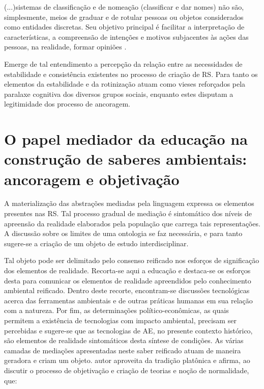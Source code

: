 \documentclass[
  12pt,       %
  openright,      %
  twoside,      %
  a4paper,      %
  english,      %
  french,       %
  spanish,      %
  brazil        %
  ]{abntex2}
\begin{document}
\begin{citacao}
(...)sistemas de classificação e de nomeação
(classificar e dar nomes) não são, simplesmente, meios de graduar
e de rotular pessoas ou objetos considerados como entidades 
discretas. Seu objetivo principal é facilitar a interpretação de 
características, a compreensão de intenções e motivos subjacentes às
ações das pessoas, na realidade, formar opiniões \cite[p.70]{Representacees_sociais_moscovici}.
\end{citacao}


Emerge de tal entendimento a percepção da relação entre as necessidades de estabilidade e consistência existentes no processo de criação de RS. Para tanto os elementos da estabilidade e da rotinização atuam como vieses reforçados pela paralaxe cognitiva dos diversos grupos sociais, enquanto estes disputam a legitimidade dos processo de ancoragem.


\section{O papel mediador da educação na construção de saberes ambientais: ancoragem e objetivação}

A materialização das abstrações mediadas pela linguagem expressa os elementos presentes nas RS. Tal processo gradual de mediação é sintomático dos níveis de apreensão da realidade elaborados pela população que carrega tais representações. A discussão sobre os limites de uma ontologia se faz necessária, e para tanto sugere-se a criação de um objeto de estudo interdisciplinar.

Tal objeto pode ser delimitado pelo consenso reificado nos esforços de significação dos elementos de realidade. Recorta-se aqui a educação e destaca-se os esforços desta para comunicar os elementos de realidade apreendidos pelo conhecimento ambiental reificado. Dentro deste recorte, encontram-se discussões tecnológicas acerca das ferramentas ambientais e de outras práticas humanas em sua relação com a natureza. Por fim, as determinações político-econômicas, as quais permitem a existência de tecnologias com impacto ambiental, precisam ser percebidas e sugere-se que as tecnologias de AE, no presente contexto histórico, são elementos de realidade sintomáticos desta síntese de condições. As várias camadas de mediações apresentadas neste saber reificado atuam de maneira geradora e criam um objeto.  autor aproveita da tradição platônica e afirma, ao discutir o processo de objetivação e criação de teorias e noção de normalidade, que:
\end{document}
